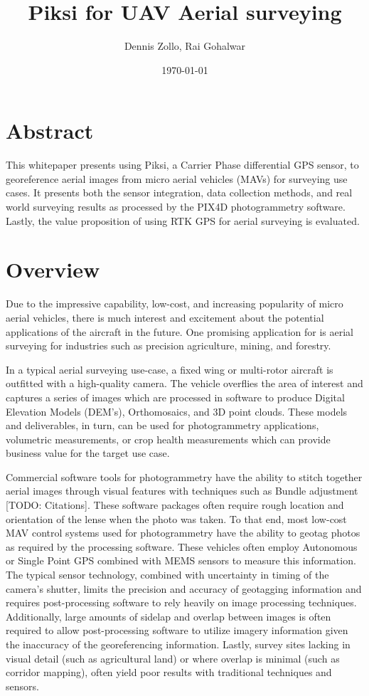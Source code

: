 \documentclass{article}
\title{Piksi for UAV Aerial surveying}
\author{Dennis Zollo, Rai Gohalwar}
\date{\today}
\begin{document}
\maketitle

\thispagestyle{firstpage}

\section{Abstract}
\label{sec:abstract}
This whitepaper presents using Piksi, a Carrier Phase differential GPS sensor, to georeference aerial images from micro aerial vehicles (MAVs) for surveying use cases.
It presents both the sensor integration, data collection methods, and real world surveying results as processed by the PIX4D photogrammetry software.  Lastly, the value proposition of using RTK GPS for aerial surveying is evaluated.
\tableofcontents
\newpage
\section{Overview}
\label{sec:Overview}
Due to the impressive capability, low-cost, and increasing popularity of micro aerial vehicles, there is much interest and excitement about the potential applications of the aircraft in the future. One promising application for is aerial surveying for industries such as precision agriculture, mining, and forestry.

In a typical aerial surveying use-case, a fixed wing or multi-rotor aircraft is outfitted with a high-quality camera.  The vehicle overflies the area of interest and captures a series of images which are processed in software to produce Digital Elevation Models (DEM's), Orthomosaics, and 3D point clouds.  These models and deliverables, in turn, can be used for photogrammetry applications, volumetric measurements, or crop health measurements which can provide business value for the target use case.

Commercial software tools for photogrammetry have the ability to stitch together aerial images through visual features with techniques such as Bundle adjustment [TODO: Citations].  These software packages often require rough location and orientation of the lense when the photo was taken. To that end, most low-cost MAV control systems used for photogrammetry have the ability to geotag photos as required by the processing software. These vehicles often employ Autonomous or Single Point GPS combined with MEMS sensors to measure this information.  The typical sensor technology, combined with uncertainty in timing of the camera's shutter, limits the precision and accuracy of geotagging information and requires post-processing software to rely heavily on image processing techniques. Additionally, large amounts of sidelap and overlap between images is often required to allow post-processing software to utilize imagery information given the inaccuracy of the georeferencing information.  Lastly, survey sites lacking in visual detail (such as agricultural land) or where overlap is minimal (such as corridor mapping), often yield poor results with traditional techniques and sensors.
\end{document}
